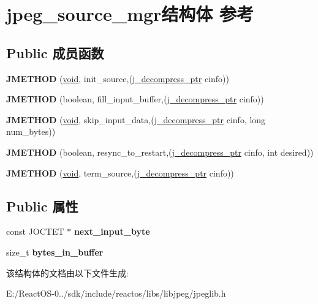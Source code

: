 \hypertarget{structjpeg__source__mgr}{}\section{jpeg\+\_\+source\+\_\+mgr结构体 参考}
\label{structjpeg__source__mgr}
\subsection*{Public 成员函数}
\begin{DoxyCompactItemize}
\item 
\mbox{\label{structjpeg__source__mgr_af8fda02c19c9dc4e505daabb77c3ad81}} 
{\bfseries J\+M\+E\+T\+H\+OD} (\hyperlink{interfacevoid}{void}, init\+\_\+source,(\hyperlink{structjpeg__decompress__struct}{j\+\_\+decompress\+\_\+ptr} cinfo))
\item 
\mbox{\label{structjpeg__source__mgr_ab4a579b1f50108e2de73c7c0c1bbb9fd}} 
{\bfseries J\+M\+E\+T\+H\+OD} (boolean, fill\+\_\+input\+\_\+buffer,(\hyperlink{structjpeg__decompress__struct}{j\+\_\+decompress\+\_\+ptr} cinfo))
\item 
\mbox{\label{structjpeg__source__mgr_a3e29df8ddadb0c15e54b69b5a7a10305}} 
{\bfseries J\+M\+E\+T\+H\+OD} (\hyperlink{interfacevoid}{void}, skip\+\_\+input\+\_\+data,(\hyperlink{structjpeg__decompress__struct}{j\+\_\+decompress\+\_\+ptr} cinfo, long num\+\_\+bytes))
\item 
\mbox{\label{structjpeg__source__mgr_a60a35ccd1fb8d954f34c0cdbf29ac010}} 
{\bfseries J\+M\+E\+T\+H\+OD} (boolean, resync\+\_\+to\+\_\+restart,(\hyperlink{structjpeg__decompress__struct}{j\+\_\+decompress\+\_\+ptr} cinfo, int desired))
\item 
\mbox{\label{structjpeg__source__mgr_a6c0683ce1166b9ee659b2d3aa1efb1c2}} 
{\bfseries J\+M\+E\+T\+H\+OD} (\hyperlink{interfacevoid}{void}, term\+\_\+source,(\hyperlink{structjpeg__decompress__struct}{j\+\_\+decompress\+\_\+ptr} cinfo))
\end{DoxyCompactItemize}
\subsection*{Public 属性}
\begin{DoxyCompactItemize}
\item 
\mbox{\label{structjpeg__source__mgr_aad884e7f4ba7496ab0f56c942c7585c1}} 
const J\+O\+C\+T\+ET $\ast$ {\bfseries next\+\_\+input\+\_\+byte}
\item 
\mbox{\label{structjpeg__source__mgr_a8ecb72557c1c9666d77fffea074282a4}} 
size\+\_\+t {\bfseries bytes\+\_\+in\+\_\+buffer}
\end{DoxyCompactItemize}


该结构体的文档由以下文件生成\+:\begin{DoxyCompactItemize}
\item 
E\+:/\+React\+O\+S-\/0../sdk/include/reactos/libs/libjpeg/jpeglib.\+h\end{DoxyCompactItemize}
